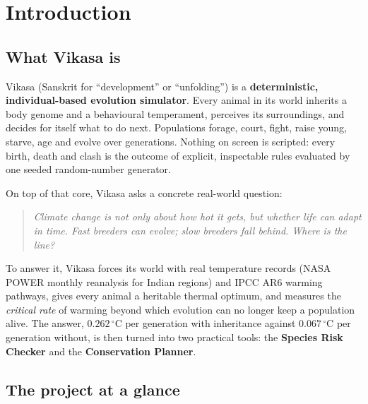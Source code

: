 \chapter{Introduction}

\section{What Vikasa is}
Vikasa (Sanskrit for ``development'' or ``unfolding'') is a \textbf{deterministic,
individual-based evolution simulator}. Every animal in its world inherits a body
genome and a behavioural temperament, perceives its surroundings, and decides for
itself what to do next. Populations forage, court, fight, raise young, starve,
age and evolve over generations. Nothing on screen is scripted: every birth,
death and clash is the outcome of explicit, inspectable rules evaluated by one
seeded random-number generator.

On top of that core, Vikasa asks a concrete real-world question:

\begin{quote}
\emph{Climate change is not only about how hot it gets, but whether life can adapt
in time. Fast breeders can evolve; slow breeders fall behind. Where is the line?}
\end{quote}

To answer it, Vikasa forces its world with real temperature records (NASA POWER
monthly reanalysis for Indian regions) and IPCC AR6 warming pathways, gives every
animal a heritable thermal optimum, and measures the \emph{critical rate} of
warming beyond which evolution can no longer keep a population alive. The answer,
$0.262\,^{\circ}$C per generation with inheritance against $0.067\,^{\circ}$C per
generation without, is then turned into two practical tools: the \textbf{Species
Risk Checker} and the \textbf{Conservation Planner}.

\section{The project at a glance}

